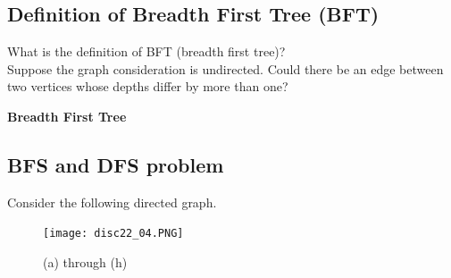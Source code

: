 \documentclass[11pt,fleqn]{book}
\begin{document}
\subsection{Definition of Breadth First Tree (BFT)}
\vspace{1em}
\begin{example}
What is the definition of BFT (breadth first tree)? \\Suppose the graph consideration is undirected. 
Could there be an edge between two vertices whose depths differ by more than one? 
\end{example}
\begin{definition}
\textbf{Breadth First Tree} 
\end{definition}
\subsection{BFS and DFS problem}
\vspace{1em}
\begin{example}
Consider the following directed graph. 
\begin{center}
\begin{figure}[H]
    \centering
    \texttt{[image: disc22\_04.PNG]}
    \caption{(a) through (h)}
    \label{}
\end{figure}
\end{center}
\end{example}
\end{document}
